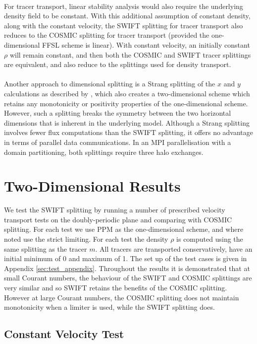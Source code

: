 \documentclass[11pt,a4paper]{article}
\begin{document}
\\
For tracer transport, linear stability analysis would also require the underlying density field to be constant.
With this additional assumption of constant density, along with the constant velocity, the SWIFT splitting for tracer transport also reduces to the COSMIC splitting for tracer transport (provided the one-dimensional FFSL scheme is linear).
With constant velocity, an initially constant $\rho$ will remain constant, and then both the COSMIC and SWIFT tracer splittings are equivalent, and also reduce to the splittings used for density transport. \\
\\
Another approach to dimensional splitting is a Strang splitting of the $x$ and $y$ calculations as described by \citet{skamarock2006limiters}, which also creates a two-dimensional scheme which retains any monotonicity or positivity properties of the one-dimensional scheme.
However, such a splitting breaks the symmetry between the two horizontal dimensions that is inherent in the underlying model.
Although a Strang splitting involves fewer flux computations than the SWIFT splitting, it offers no advantage in terms of parallel data communications.
In an MPI parallelisation with a domain partitioning, both splittings require three halo exchanges.

\section{Two-Dimensional Results} \label{sec:resultd2d}

We test the SWIFT splitting by running a number of prescribed velocity transport tests on the doubly-periodic plane and comparing with COSMIC splitting. For each test we use PPM as the one-dimensional scheme, and where noted use the strict limiting. For each test the density $\rho$ is computed using the same splitting as the tracer $m$.
All tracers are transported conservatively, have an initial minimum of 0 and maximum of 1.
The set up of the test cases is given in Appendix \ref{sec:test_appendix}.
Throughout the results it is demonstrated that at small Courant numbers, the behaviour of the SWIFT and COSMIC splittings are very similar and so SWIFT retains the benefits of the COSMIC splitting. However at large Courant numbers, the COSMIC splitting does not maintain monotonicity when a limiter is used, while the SWIFT splitting does.

\subsection{Constant Velocity Test} \label{sec:test1}
\end{document}
